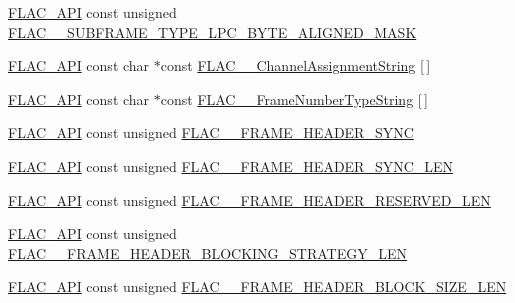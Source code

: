 \begin{DoxyCompactItemize}
\item 
\mbox{\hyperlink{group__flac__export_ga56ca07df8a23310707732b1c0007d6f5}{F\+L\+A\+C\+\_\+\+A\+PI}} const unsigned \mbox{\hyperlink{group__flac__format_gac5ee2d30e02fe8a3a2fe5417e1200434}{F\+L\+A\+C\+\_\+\+\_\+\+S\+U\+B\+F\+R\+A\+M\+E\+\_\+\+T\+Y\+P\+E\+\_\+\+L\+P\+C\+\_\+\+B\+Y\+T\+E\+\_\+\+A\+L\+I\+G\+N\+E\+D\+\_\+\+M\+A\+SK}}
\item 
\mbox{\hyperlink{group__flac__export_ga56ca07df8a23310707732b1c0007d6f5}{F\+L\+A\+C\+\_\+\+A\+PI}} const char $\ast$const \mbox{\hyperlink{group__flac__format_ga56e0484fe205ab9f699ba5413c8441a1}{F\+L\+A\+C\+\_\+\+\_\+\+Channel\+Assignment\+String}} \mbox{[}$\,$\mbox{]}
\item 
\mbox{\hyperlink{group__flac__export_ga56ca07df8a23310707732b1c0007d6f5}{F\+L\+A\+C\+\_\+\+A\+PI}} const char $\ast$const \mbox{\hyperlink{group__flac__format_ga79fbcf4b5c8dd457f83782479fe01222}{F\+L\+A\+C\+\_\+\+\_\+\+Frame\+Number\+Type\+String}} \mbox{[}$\,$\mbox{]}
\item 
\mbox{\hyperlink{group__flac__export_ga56ca07df8a23310707732b1c0007d6f5}{F\+L\+A\+C\+\_\+\+A\+PI}} const unsigned \mbox{\hyperlink{group__flac__format_gaf8a0d3e8d4b884184d9c3989480748e9}{F\+L\+A\+C\+\_\+\+\_\+\+F\+R\+A\+M\+E\+\_\+\+H\+E\+A\+D\+E\+R\+\_\+\+S\+Y\+NC}}
\item 
\mbox{\hyperlink{group__flac__export_ga56ca07df8a23310707732b1c0007d6f5}{F\+L\+A\+C\+\_\+\+A\+PI}} const unsigned \mbox{\hyperlink{group__flac__format_gaf8b98ef56e49b221414aadbea5baaaf0}{F\+L\+A\+C\+\_\+\+\_\+\+F\+R\+A\+M\+E\+\_\+\+H\+E\+A\+D\+E\+R\+\_\+\+S\+Y\+N\+C\+\_\+\+L\+EN}}
\item 
\mbox{\hyperlink{group__flac__export_ga56ca07df8a23310707732b1c0007d6f5}{F\+L\+A\+C\+\_\+\+A\+PI}} const unsigned \mbox{\hyperlink{group__flac__format_ga70f1f45eade9d2972370a4b35e937822}{F\+L\+A\+C\+\_\+\+\_\+\+F\+R\+A\+M\+E\+\_\+\+H\+E\+A\+D\+E\+R\+\_\+\+R\+E\+S\+E\+R\+V\+E\+D\+\_\+\+L\+EN}}
\item 
\mbox{\hyperlink{group__flac__export_ga56ca07df8a23310707732b1c0007d6f5}{F\+L\+A\+C\+\_\+\+A\+PI}} const unsigned \mbox{\hyperlink{group__flac__format_ga06bb43ed744b3d1c79628a8a9146c064}{F\+L\+A\+C\+\_\+\+\_\+\+F\+R\+A\+M\+E\+\_\+\+H\+E\+A\+D\+E\+R\+\_\+\+B\+L\+O\+C\+K\+I\+N\+G\+\_\+\+S\+T\+R\+A\+T\+E\+G\+Y\+\_\+\+L\+EN}}
\item 
\mbox{\hyperlink{group__flac__export_ga56ca07df8a23310707732b1c0007d6f5}{F\+L\+A\+C\+\_\+\+A\+PI}} const unsigned \mbox{\hyperlink{group__flac__format_ga32eacb5eab350bd660144035e2b566c8}{F\+L\+A\+C\+\_\+\+\_\+\+F\+R\+A\+M\+E\+\_\+\+H\+E\+A\+D\+E\+R\+\_\+\+B\+L\+O\+C\+K\+\_\+\+S\+I\+Z\+E\+\_\+\+L\+EN}}

\end{DoxyCompactItemize}
